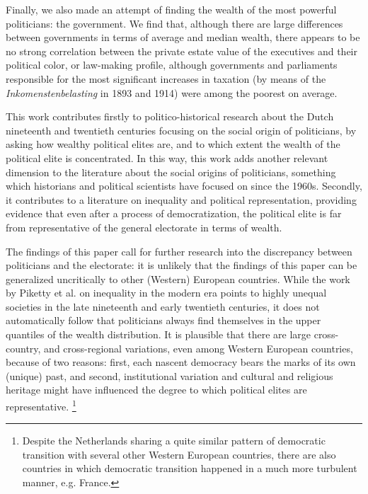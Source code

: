     Finally, we also made an attempt of finding the wealth of the most powerful politicians: the government. We find that, although there are large differences between governments in terms of average and median wealth, there appears to be no strong correlation between the private estate value of the executives and their political color, or law-making profile, although governments and parliaments responsible for the most significant increases in taxation (by means of the \textit{Inkomenstenbelasting} in 1893 and 1914) were among the poorest on average.

    This work contributes firstly to politico-historical research about the Dutch nineteenth and twentieth centuries focusing on the social origin of politicians, by asking how wealthy political elites are, and to which extent the wealth of the political elite is concentrated. \autocite{van1983toegang, secker1989social, secker1991ministers, van1999eerste, moes2012onder} In this way, this work adds another relevant dimension to the literature about the social origins of politicians, something which historians and political scientists have focused on since the 1960s.\autocite{dogan1967filieres,van1983toegang} Secondly, it contributes to a literature on inequality and political representation, providing evidence that even after a process of democratization, the political elite is far from representative of the general electorate in terms of wealth.\autocite{dalton1985political}

    The findings of this paper call for further research into the discrepancy between politicians and the electorate: it is unlikely that the findings of this paper can be generalized uncritically to other (Western) European countries. While the work by Piketty et al. on inequality in the modern era points to highly unequal societies in the late nineteenth and early twentieth centuries, it does not automatically follow that politicians always find themselves in the upper quantiles of the wealth distribution. \autocite{piketty2003income, piketty2014inequality} It is plausible that there are large cross-country, and cross-regional variations, even among Western European countries, because of two reasons: first, each nascent democracy bears the marks of its own (unique) past, and second, institutional variation and cultural and religious heritage might have influenced the degree to which political elites are representative. \autocite{acemoglu2011consequences} \footnote{Despite the Netherlands sharing a quite similar pattern of democratic transition with several other Western European countries, there are also countries in which democratic transition happened in a much more turbulent manner, e.g. France. }

